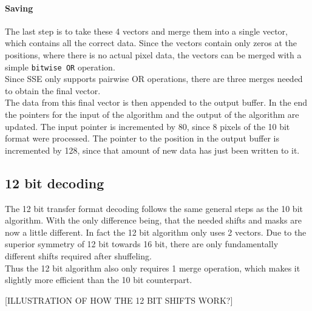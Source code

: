\paragraph{Saving}

The last step is to take these 4 vectors and merge them into a single vector, which contains all the correct data. Since the vectors contain only zeros at the positions, where there is no actual pixel data, the vectors can be merged with a simple \texttt{bitwise OR} operation.\\
Since SSE only supports pairwise OR operations, there are three merges needed to obtain the final vector.\\
The data from this final vector is then appended to the output buffer. In the end the pointers for the input of the algorithm and the output of the algorithm are updated. The input pointer is incremented by 80, since 8 pixels of the 10 bit format were processed. The pointer to the position in the output buffer is incremented by 128, since that amount of new data has just been written to it.


\subsection{12 bit decoding}

The 12 bit transfer format decoding follows the same general steps as the 10 bit algorithm. With the only difference being, that the needed shifts and masks are now a little different. In fact the 12 bit algorithm only uses 2 vectors. Due to the superior symmetry of 12 bit towards 16 bit, there are only fundamentally different shifts required after shuffeling.\\
Thus the 12 bit algorithm also only requires 1 merge operation, which makes it slightly more efficient than the 10 bit counterpart.

[ILLUSTRATION OF HOW THE 12 BIT SHIFTS WORK?]


